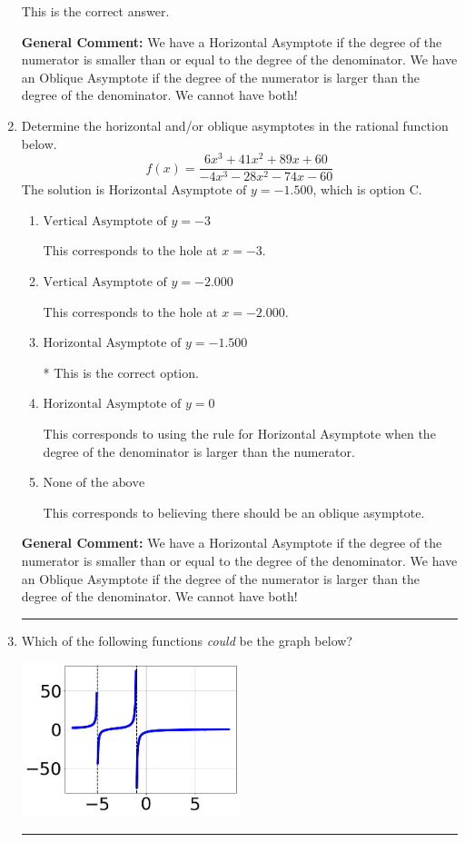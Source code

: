 \documentclass{extbook}[14pt]
\newcommand{\litem}[1]{\item #1

\rule{\textwidth}{0.4pt}}
\begin{document}
\begin{enumerate}
{\begin{enumerate}[label=\Alph*.]
This is the correct answer.
\end{enumerate}

\textbf{General Comment:} We have a Horizontal Asymptote if the degree of the numerator is smaller than or equal to the degree of the denominator. We have an Oblique Asymptote if the degree of the numerator is larger than the degree of the denominator. We cannot have both!
}
\litem{
Determine the horizontal and/or oblique asymptotes in the rational function below.
\[ f(x) = \frac{6x^{3} +41 x^{2} +89 x + 60}{-4x^{3} -28 x^{2} -74 x -60} \]The solution is \( \text{Horizontal Asymptote of } y = -1.500  \), which is option C.\begin{enumerate}[label=\Alph*.]
\item \( \text{Vertical Asymptote of } y = -3  \)

This corresponds to the hole at $x = -3$.
\item \( \text{Vertical Asymptote of } y = -2.000  \)

This corresponds to the hole at $x = -2.000$.
\item \( \text{Horizontal Asymptote of } y = -1.500  \)

* This is the correct option.
\item \( \text{Horizontal Asymptote of } y = 0  \)

This corresponds to using the rule for Horizontal Asymptote when the degree of the denominator is larger than the numerator.
\item \( \text{None of the above} \)

This corresponds to believing there should be an oblique asymptote.
\end{enumerate}

\textbf{General Comment:} We have a Horizontal Asymptote if the degree of the numerator is smaller than or equal to the degree of the denominator. We have an Oblique Asymptote if the degree of the numerator is larger than the degree of the denominator. We cannot have both!
}
\litem{
Which of the following functions \textit{could} be the graph below?

\begin{center}
    \includegraphics[width=0.5\textwidth]{../Figures/identifyGraphOfRationalFunctionC.png}
\end{center}


}
\end{enumerate}
\end{document}
